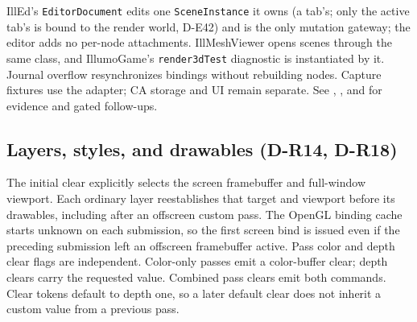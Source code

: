 IllEd's \texttt{EditorDocument} edits one \texttt{SceneInstance} it owns (a
tab's; only the active tab's is bound to the render world, D-E42) and is the
only mutation gateway; the editor adds no per-node attachments. IllMeshViewer
opens scenes through the same class, and IllumoGame's \texttt{render3dTest}
diagnostic is  instantiated by
it. Journal overflow resynchronizes bindings without rebuilding nodes. Capture
fixtures use the adapter; CA storage and UI remain separate. See
,
, and
 for evidence and gated
follow-ups.

\subsection{Layers, styles, and drawables (D-R14, D-R18)}
The initial clear explicitly selects the screen framebuffer and full-window
viewport. Each ordinary layer reestablishes that target and viewport before
its drawables, including after an offscreen custom pass. The OpenGL binding
cache starts unknown on each submission, so the first screen bind is issued
even if the preceding submission left an offscreen framebuffer active.
Pass color and depth clear flags are independent. Color-only passes emit a
color-buffer clear; depth clears carry the requested value. Combined pass
clears emit both commands. Clear tokens default to depth one, so a later
default clear does not inherit a custom value from a previous pass.

